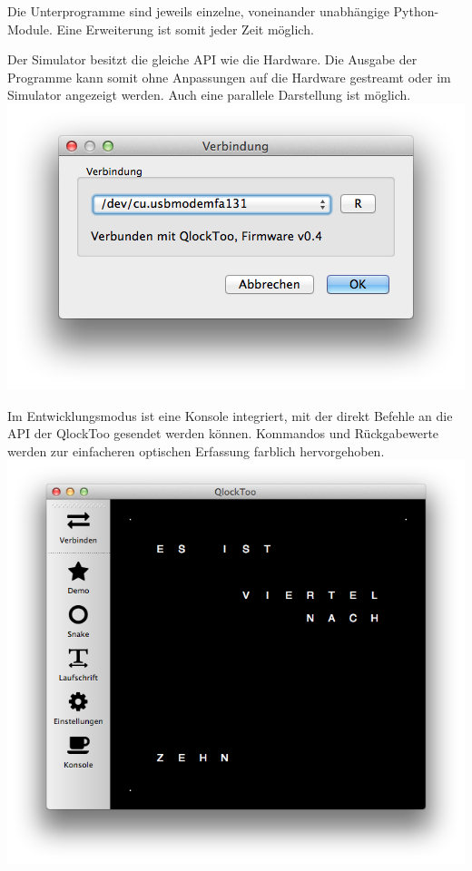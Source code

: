 \begin{multicols}{2}
Die Unterprogramme sind jeweils einzelne, voneinander unabhängige Python-Module. Eine Erweiterung ist somit jeder Zeit möglich. 

Der Simulator besitzt die gleiche API wie die Hardware. Die Ausgabe der Programme kann somit ohne Anpassungen auf die Hardware gestreamt oder im Simulator angezeigt werden. Auch eine parallele Darstellung ist möglich.
\includegraphics[width=\columnwidth]{Abbildungen/Software/ConnectDialog}

Im Entwicklungsmodus ist eine Konsole integriert, mit der direkt Befehle an die API der QlockToo gesendet werden können. Kommandos und Rückgabewerte werden zur einfacheren optischen Erfassung farblich hervorgehoben.
\includegraphics[width=0.9\columnwidth]{Abbildungen/Software/Manager}



\end{multicols}
